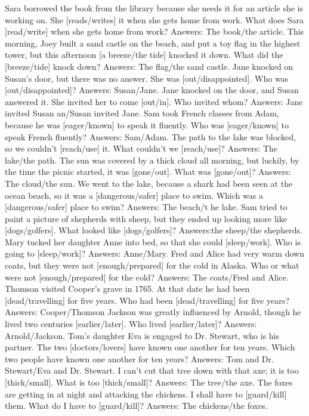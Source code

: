 \begin{foo}
Sara borrowed the book from the library because she needs it for an article she is working on. She [reads/writes] it when she gets home from work. What does Sara [read/write] when she gets home from work? Answers: The book/the article.
This morning, Joey built a sand castle on the beach, and put a toy flag in the highest tower, but this afternoon [a breeze/the tide] knocked it down. What did the [breeze/tide] knock down? Answers: The  flag/the sand castle.
Jane knocked on Susan's door, but there was no answer. She was [out/disappointed]. Who was [out/disappointed]? Answers: Susan/Jane.
Jane knocked on the door, and Susan answered it. She invited her to come [out/in]. Who invited whom? Answers: Jane invited Susan an/Susan invited Jane.
Sam took French classes from Adam, because he was [eager/known] to speak it fluently. Who was [eager/known] to speak French fluently? Answers: Sam/Adam.
The path to the lake was blocked, so we couldn't [reach/use] it. What couldn't we [reach/use]? Answers: The lake/the path.
The sun was covered by a thick cloud all morning, but luckily, by the time the picnic started, it was [gone/out]. What was [gone/out]? Answers: The cloud/the sun.
We went to the lake, because a shark had been seen at the ocean beach, so it was a [dangerous/safer] place to swim. Which was a [dangerous/safer] place to swim? Answers: The beach/t he lake.
Sam tried to paint a picture of shepherds with sheep, but they ended up looking more like [dogs/golfers]. What looked like [dogs/golfers]? Answers:the sheep/the shepherds.
Mary tucked her daughter Anne into bed, so that she could [sleep/work]. Who is going to [sleep/work]? Answers: Anne/Mary.
Fred and Alice had very warm down coats, but they were not [enough/prepared] for the cold in Alaska. Who or what were not [enough/prepared] for the cold? Answers: The coats/Fred and Alice.
Thomson visited Cooper's grave in 1765. At that date he had been [dead/travelling] for five years. Who had been [dead/travelling] for five years? Answers: Cooper/Thomson
Jackson was greatly influenced by Arnold, though he lived two centuries [earlier/later]. Who lived [earlier/later]? Answers: Arnold/Jackson.
Tom's daughter Eva is engaged to Dr. Stewart, who is his partner. The two [doctors/lovers] have known one another for ten years. Which two people have known one another for ten years? Answers: Tom and Dr. Stewart/Eva and Dr. Stewart.
I can't cut that tree down with that axe; it is too [thick/small]. What is too [thick/small]? Answers: The tree/the axe.
The foxes are getting in at night and attacking the chickens. I shall have to [guard/kill] them. What do I have to [guard/kill]? Answers: The chickens/the foxes.

\end{foo}
